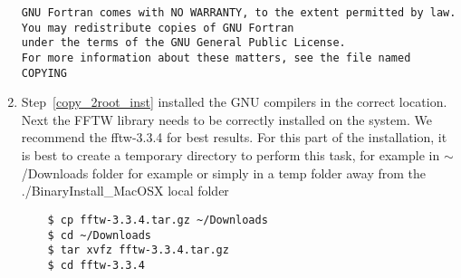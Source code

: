 \documentclass[review]{elsarticle}
\begin{document}
\begin{enumerate}
\begin{verbatim}
GNU Fortran comes with NO WARRANTY, to the extent permitted by law.
You may redistribute copies of GNU Fortran
under the terms of the GNU General Public License.
For more information about these matters, see the file named COPYING
\end{verbatim}

\item {\label{inst_fftw}} Step~\ref{copy_2root_inst} installed the GNU
  compilers in the correct location. Next the FFTW library needs to be
  correctly installed on the system. We recommend the fftw-3.3.4 for
  best results. For this part of the installation, it is best to
  create a temporary directory to perform this task, for example in
  $\sim$/Downloads folder for example or simply in a temp folder away from
  the ./BinaryInstall\_MacOSX local folder

\begin{verbatim}
    $ cp fftw-3.3.4.tar.gz ~/Downloads
    $ cd ~/Downloads
    $ tar xvfz fftw-3.3.4.tar.gz
    $ cd fftw-3.3.4
\end{verbatim}


\end{enumerate}
\end{document}

